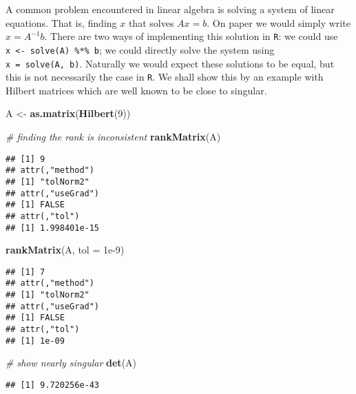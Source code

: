 \documentclass[]{article}
\newenvironment{Shaded}{\begin{snugshade}}{\end{snugshade}}
\newcommand{\CommentTok}[1]{\textcolor[rgb]{0.56,0.35,0.01}{\textit{#1}}}
\newcommand{\DataTypeTok}[1]{\textcolor[rgb]{0.13,0.29,0.53}{#1}}
\newcommand{\DecValTok}[1]{\textcolor[rgb]{0.00,0.00,0.81}{#1}}
\newcommand{\FloatTok}[1]{\textcolor[rgb]{0.00,0.00,0.81}{#1}}
\newcommand{\KeywordTok}[1]{\textcolor[rgb]{0.13,0.29,0.53}{\textbf{#1}}}
\newcommand{\NormalTok}[1]{#1}
\newcommand{\StringTok}[1]{\textcolor[rgb]{0.31,0.60,0.02}{#1}}
\begin{document}
A common problem encountered in linear algebra is solving a system of
linear equations. That is, finding \(x\) that solves \(Ax = b\). On
paper we would simply write \(x = A^{-1}b\). There are two ways of
implementing this solution in \texttt{R}: we could use
\texttt{x\ \textless{}-\ solve(A)\ \%*\%\ b}; we could directly solve
the system using \texttt{x\ =\ solve(A,\ b)}. Naturally we would expect
these solutions to be equal, but this is not necessarily the case in
\texttt{R}. We shall show this by an example with Hilbert matrices which
are well known to be close to singular.

\begin{Shaded}
\begin{Highlighting}[]
\NormalTok{A <-}\StringTok{ }\KeywordTok{as.matrix}\NormalTok{(}\KeywordTok{Hilbert}\NormalTok{(}\DecValTok{9}\NormalTok{))}

\CommentTok{# finding the rank is inconsistent}
\KeywordTok{rankMatrix}\NormalTok{(A)}
\end{Highlighting}
\end{Shaded}

\begin{verbatim}
## [1] 9
## attr(,"method")
## [1] "tolNorm2"
## attr(,"useGrad")
## [1] FALSE
## attr(,"tol")
## [1] 1.998401e-15
\end{verbatim}

\begin{Shaded}
\begin{Highlighting}[]
\KeywordTok{rankMatrix}\NormalTok{(A, }\DataTypeTok{tol =} \FloatTok{1e-9}\NormalTok{)}
\end{Highlighting}
\end{Shaded}

\begin{verbatim}
## [1] 7
## attr(,"method")
## [1] "tolNorm2"
## attr(,"useGrad")
## [1] FALSE
## attr(,"tol")
## [1] 1e-09
\end{verbatim}

\begin{Shaded}
\begin{Highlighting}[]
\CommentTok{# show nearly singular}
\KeywordTok{det}\NormalTok{(A)}
\end{Highlighting}
\end{Shaded}

\begin{verbatim}
## [1] 9.720256e-43
\end{verbatim}
\end{document}
